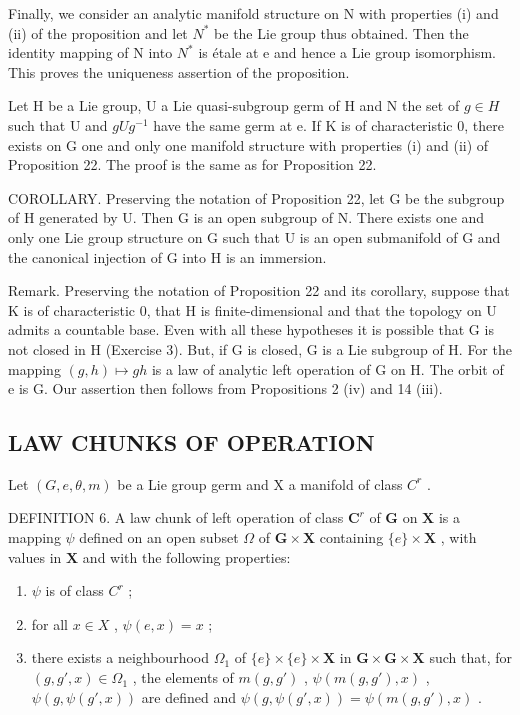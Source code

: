 Finally, we consider an analytic manifold structure on N with properties (i) and (ii) of the proposition and let \(N^{*}\) be the Lie group thus obtained. Then the identity mapping of N into \(N^{*}\) is étale at e and hence a Lie group isomorphism. This proves the uniqueness assertion of the proposition.

Let H be a Lie group, U a Lie quasi-subgroup germ of H and N the set of \(g \in H\) such that U and \(gUg^{-1}\) have the same germ at e. If K is of characteristic 0, there exists on G one and only one manifold structure with properties (i) and (ii) of Proposition 22. The proof is the same as for Proposition 22.

COROLLARY. Preserving the notation of Proposition 22, let G be the subgroup of H generated by U. Then G is an open subgroup of N. There exists one and only one Lie group structure on G such that U is an open submanifold of G and the canonical injection of G into H is an immersion.

Remark. Preserving the notation of Proposition 22 and its corollary, suppose that K is of characteristic 0, that H is finite-dimensional and that the topology on U admits a countable base. Even with all these hypotheses it is possible that G is not closed in H (Exercise 3). But, if G is closed, G is a Lie subgroup of H. For the mapping \((g,h)\mapsto gh\) is a law of analytic left operation of G on H. The orbit of e is G. Our assertion then follows from Propositions 2 (iv) and 14 (iii).

\subsection{LAW CHUNKS OF OPERATION}

Let \((G, e, \theta, m)\) be a Lie group germ and X a manifold of class \(C^r\) .

DEFINITION 6. A law chunk of left operation of class \(\mathbf{C}^r\) of \(\mathbf{G}\) on \(\mathbf{X}\) is a mapping \(\psi\) defined on an open subset \(\Omega\) of \(\mathbf{G} \times \mathbf{X}\) containing \(\{e\} \times \mathbf{X}\) , with values in \(\mathbf{X}\) and with the following properties:

\begin{enumerate}
\def\labelenumi{(\roman{enumi})}
\item
  \(\psi\) is of class \(C^{r}\) ;
\item
  for all \(x \in X\) , \(\psi(e, x) = x\) ;
\item
  there exists a neighbourhood \(\Omega_1\) of \(\{e\} \times \{e\} \times \mathbf{X}\) in \(\mathbf{G} \times \mathbf{G} \times \mathbf{X}\) such that, for \((g, g', x) \in \Omega_1\) , the elements of \(m(g, g')\) , \(\psi(m(g, g'), x)\) , \(\psi(g, \psi(g', x))\) are defined and \(\psi(g, \psi(g', x)) = \psi(m(g, g'), x)\) .
\end{enumerate}

